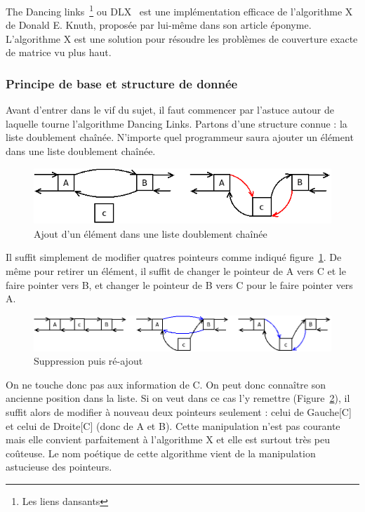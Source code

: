 \documentclass[a4paper]{article}
\begin{document}
The Dancing links~\footnote{Les liens dansants} ou DLX~\cite{dlx} 
est une implémentation efficace de l'algorithme X de Donald 
E. Knuth, proposée par lui-même dans son article éponyme. 
L'algorithme X est une solution pour résoudre 
les problèmes de couverture exacte de matrice vu plus haut.



\subsubsection{Principe de base et structure de donnée}

Avant d'entrer dans le vif du sujet, il faut commencer par l'astuce autour de 
laquelle tourne l'algorithme Dancing Links.
Partons d'une structure connue : la liste doublement chaînée.
N'importe quel programmeur saura ajouter un élément dans une liste doublement
chaînée.


\begin{figure}[h]
\begin{center}
\includegraphics[scale=0.5]{../imports/add_elmt_dll.png}
\caption{\label{add_dll} Ajout d'un élément dans une liste doublement chaînée}
\end{center}
\end{figure}


Il suffit simplement de modifier quatres pointeurs comme indiqué 
figure~\ref{add_dll}. De même pour retirer un élément, il suffit de changer le 
pointeur de A vers C et le faire pointer vers B, et changer le pointeur de 
B vers C pour le faire pointer vers A. 

\begin{figure}[h]
\begin{center}
\includegraphics[scale=0.5]{../imports/delete.png}
\caption{\label{delete_dll} Suppression puis ré-ajout}
\end{center}
\end{figure}

On ne touche donc pas aux information de C. 
On peut donc connaître son ancienne position dans la liste. Si on veut
dans ce cas l'y remettre (Figure~\ref{delete_dll}), il suffit alors de modifier
à nouveau deux pointeurs
seulement : celui de Gauche[C] et celui de Droite[C] (donc de A et B).
Cette manipulation n'est pas courante mais elle convient parfaitement à 
l'algorithme X et elle est surtout très peu coûteuse.
Le nom poétique de cette algorithme vient de la manipulation astucieuse des 
pointeurs.
\end{document}

